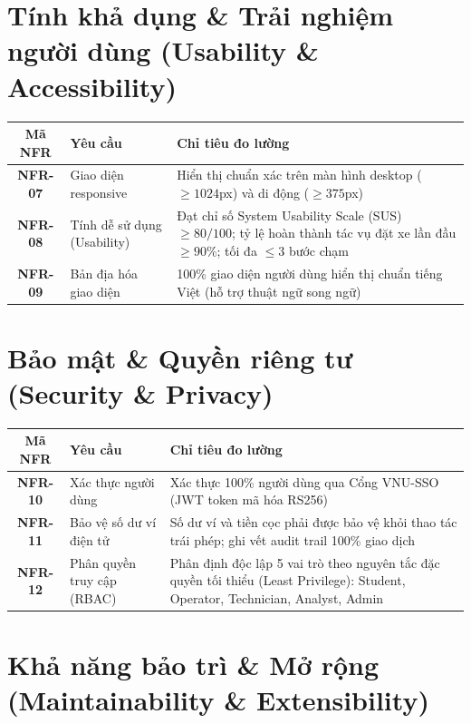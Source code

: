 \documentclass[12pt,a4paper]{report}
\begin{document}
\section{Tính khả dụng \& Trải nghiệm người dùng (Usability \& Accessibility)}

\begin{longtable}{|c|p{4cm}|p{7cm}|}
    \hline
    \textbf{Mã NFR} & \textbf{Yêu cầu} & \textbf{Chỉ tiêu đo lường} \\
    \hline
    \textbf{NFR-07} & Giao diện responsive & Hiển thị chuẩn xác trên màn hình desktop ($\ge 1024$px) và di động ($\ge 375$px) \\
    \hline
    \textbf{NFR-08} & Tính dễ sử dụng (Usability) & Đạt chỉ số System Usability Scale (SUS) $\ge 80/100$; tỷ lệ hoàn thành tác vụ đặt xe lần đầu $\ge 90\%$; tối đa $\le 3$ bước chạm \\
    \hline
    \textbf{NFR-09} & Bản địa hóa giao diện & 100\% giao diện người dùng hiển thị chuẩn tiếng Việt (hỗ trợ thuật ngữ song ngữ) \\
    \hline
\end{longtable}

\section{Bảo mật \& Quyền riêng tư (Security \& Privacy)}

\begin{longtable}{|c|p{4cm}|p{7cm}|}
    \hline
    \textbf{Mã NFR} & \textbf{Yêu cầu} & \textbf{Chỉ tiêu đo lường} \\
    \hline
    \textbf{NFR-10} & Xác thực người dùng & Xác thực 100\% người dùng qua Cổng VNU-SSO (JWT token mã hóa RS256) \\
    \hline
    \textbf{NFR-11} & Bảo vệ số dư ví điện tử & Số dư ví và tiền cọc phải được bảo vệ khỏi thao tác trái phép; ghi vết audit trail 100\% giao dịch \\
    \hline
    \textbf{NFR-12} & Phân quyền truy cập (RBAC) & Phân định độc lập 5 vai trò theo nguyên tắc đặc quyền tối thiểu (Least Privilege): Student, Operator, Technician, Analyst, Admin \\
    \hline
\end{longtable}

\section{Khả năng bảo trì \& Mở rộng (Maintainability \& Extensibility)}
\end{document}
